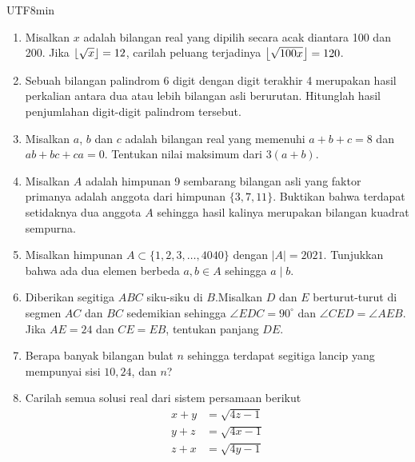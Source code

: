 \documentclass[11pt, letterpaper]{article}
\begin{document}
\begin{CJK*}{UTF8}{min}
	

\begin{enumerate}
	\item
	Misalkan $x$ adalah bilangan real yang dipilih secara acak diantara 100 dan 200. Jika $\left\lfloor \sqrt{x} \right\rfloor=12$, carilah peluang terjadinya $\left\lfloor \sqrt{100x} \right\rfloor=120$.
	

    \item
        Sebuah bilangan palindrom 6 digit dengan digit terakhir 4 merupakan hasil perkalian antara dua atau lebih bilangan asli berurutan. Hitunglah hasil penjumlahan digit-digit palindrom tersebut.
    

    \item
        Misalkan $a$, $b$ dan $c$ adalah bilangan real yang memenuhi $a + b + c = 8$ dan $ab + bc + ca = 0$.
Tentukan nilai maksimum dari $3(a + b)$.
    

    \item
    Misalkan $A$ adalah himpunan 9 sembarang bilangan asli yang faktor primanya adalah anggota dari himpunan $\{3,7,11\}$. Buktikan bahwa terdapat setidaknya dua anggota $A$ sehingga hasil kalinya merupakan bilangan kuadrat sempurna.


\item
    Misalkan himpunan $A \subset \{1,2,3,\dots,4040\}$ dengan $|A| = 2021$. Tunjukkan bahwa ada dua elemen berbeda $a,b \in A$ sehingga $a \mid b$.

	
	\item
	Diberikan segitiga $ABC$ siku-siku di $B$.Misalkan $D$ dan $E$ berturut-turut di segmen $AC$ dan $BC$ sedemikian sehingga $\angle EDC= 90^\circ$ dan $\angle CED = \angle AEB$. Jika $AE = 24$ dan $CE=EB$, tentukan panjang $DE$.
	
	
	\item
	Berapa banyak bilangan bulat $n$ sehingga terdapat segitiga lancip yang mempunyai sisi $10,24$, dan $n$?
	

        \item
        Carilah semua solusi real dari sistem persamaan berikut
	\begin{align*}
		x+y &= \sqrt{4z-1} \\
		y+z &= \sqrt{4x-1} \\
		z+x &= \sqrt{4y-1}
	\end{align*}
    


\end{enumerate}
\end{CJK*}
\end{document}
